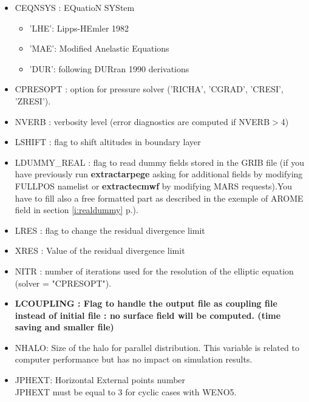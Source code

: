 \begin{itemize}
\item CEQNSYS : EQuatioN SYStem
\begin{itemize}
\item 'LHE': Lipps-HEmler 1982
\item 'MAE': Modified Anelastic Equations
\item 'DUR': following DURran 1990 derivations
\end{itemize}

\item CPRESOPT : option for pressure solver 
('RICHA', 'CGRAD', 'CRESI', 'ZRESI').

\item NVERB : verbosity level (error diagnostics are computed if
NVERB$>$4)

\item LSHIFT : flag to shift altitudes in boundary layer

\item LDUMMY\_REAL : flag to read dummy fields stored in the GRIB file (if you have previously run {\bf extractarpege}
asking for additional fields by modifying FULLPOS namelist or {\bf extractecmwf} by modifying MARS requests).You have to fill also a free formatted part as described in the exemple of AROME field in section \ref{i:realdummy} p.\pageref{i:realdummy}).

\item LRES : flag to change the residual divergence limit

\item XRES : Value of the residual divergence limit

\item
NITR  : number of  iterations used for the resolution of the elliptic equation (solver = "CPRESOPT").

\item \textbf{LCOUPLING : Flag to handle the output file as coupling file instead of initial file : no surface field will be computed. (time saving and smaller file) }

\item
NHALO: Size of the halo for parallel distribution.
This variable is related to computer performance but has no
impact on simulation results.\\

\item
JPHEXT:  Horizontal External points number\\
JPHEXT must be equal to 3 for cyclic cases with WENO5.

\end{itemize}


